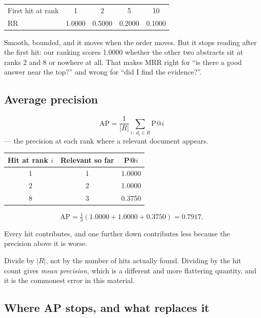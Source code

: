 \documentclass[11pt,a4paper]{article}
\begin{document}
\begin{center}
\small
\begin{tabular}{lcccc}
\toprule
First hit at rank & 1 & 2 & 5 & 10 \\
RR & 1.0000 & 0.5000 & 0.2000 & 0.1000 \\
\bottomrule
\end{tabular}
\end{center}

Smooth, bounded, and it moves when the order moves. But it stops reading after
the first hit: our ranking scores 1.0000 whether the other two abstracts sit at
ranks 2 and 8 or nowhere at all. That makes MRR right for ``is there a good
answer near the top?'' and wrong for ``did I find the evidence?''.

\subsection{Average precision}

\[
  \text{AP} = \frac{1}{|R|} \sum_{i \,:\, d_i \in R} \text{P}@i
\]
--- the precision at each rank where a relevant document appears.

\begin{center}
\small
\begin{tabular}{ccc}
\toprule
\textbf{Hit at rank $i$} & \textbf{Relevant so far} & \textbf{P@$i$} \\
\midrule
1 & 1 & 1.0000 \\
2 & 2 & 1.0000 \\
8 & 3 & 0.3750 \\
\bottomrule
\end{tabular}
\end{center}

\[ \text{AP} = \tfrac{1}{3}\left(1.0000 + 1.0000 + 0.3750\right) = 0.7917. \]

Every hit contributes, and one further down contributes less because the
precision above it is worse.

\begin{failbox}[title={Failure condition --- where marks are lost}]
Divide by $|R|$, not by the number of hits actually found. Dividing by the hit
count gives \emph{mean precision}, which is a different and more flattering
quantity, and it is the commonest error in this material.
\end{failbox}

\subsection{Where AP stops, and what replaces it}
\end{document}
